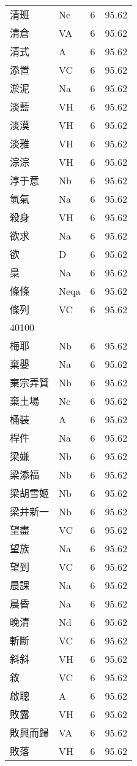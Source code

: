 \documentclass[twocolumn]{book}
\begin{document}
\begin{supertabular}{llrr}
清班 & Nc & 6 &  95.62\\
清倉 & VA & 6 &  95.62\\
清式 & A & 6 &  95.62\\
添置 & VC & 6 &  95.62\\
淤泥 & Na & 6 &  95.62\\
淡藍 & VH & 6 &  95.62\\
淡漠 & VH & 6 &  95.62\\
淡雅 & VH & 6 &  95.62\\
淙淙 & VH & 6 &  95.62\\
淳于意 & Nb & 6 &  95.62\\
氫氣 & Na & 6 &  95.62\\
殺身 & VH & 6 &  95.62\\
欲求 & Na & 6 &  95.62\\
欲 & D & 6 &  95.62\\
梟 & Na & 6 &  95.62\\
條條 & Neqa & 6 &  95.62\\
條列 & VC & 6 &  95.62\\
40100\\
梅耶 & Nb & 6 &  95.62\\
棄嬰 & Na & 6 &  95.62\\
棄宗弄贊 & Nb & 6 &  95.62\\
棄土場 & Nc & 6 &  95.62\\
桶裝 & A & 6 &  95.62\\
桿件 & Na & 6 &  95.62\\
梁嫌 & Nb & 6 &  95.62\\
梁添福 & Nb & 6 &  95.62\\
梁胡雪姬 & Nb & 6 &  95.62\\
梁井新一 & Nb & 6 &  95.62\\
望盡 & VC & 6 &  95.62\\
望族 & Na & 6 &  95.62\\
望到 & VC & 6 &  95.62\\
晨課 & Na & 6 &  95.62\\
晨昏 & Na & 6 &  95.62\\
晚清 & Nd & 6 &  95.62\\
斬斷 & VC & 6 &  95.62\\
斜斜 & VH & 6 &  95.62\\
敘 & VC & 6 &  95.62\\
啟聰 & A & 6 &  95.62\\
敗露 & VH & 6 &  95.62\\
敗興而歸 & VA & 6 &  95.62\\
敗落 & VH & 6 &  95.62\\

\end{supertabular}
\end{document}
